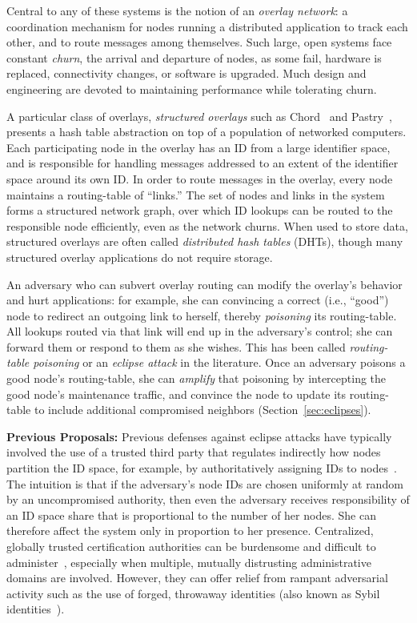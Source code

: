 \documentclass[10pt,twocolumn]{article}
\renewcommand{\paragraph}[1]{\textbf{#1:}}
\begin{document}
Central to any of these systems is the notion of an {\em overlay
network}: a coordination mechanism for nodes running 
a distributed application to track each other, and to route messages
among themselves.  
Such large, open systems face constant \emph{churn},
the arrival and departure of nodes, as some fail,
hardware is replaced, connectivity changes, or software is upgraded.  
Much design and engineering are devoted to maintaining performance while
tolerating churn.

A particular class of overlays, \emph{structured overlays}
such as Chord~\cite{Stoica2003} and Pastry~\cite{Rowstron2001},
presents a hash table abstraction on top of a population of networked
computers.  Each participating node in the overlay has an ID from
a large identifier space, and is responsible for handling
messages addressed to an extent of the identifier space around its own
ID.  In order
to route messages in the overlay,
every node maintains a
routing-table of ``links.''  The set of nodes and links in the system 
forms a structured network graph, over which
ID lookups can be routed to the responsible node efficiently,
even as the network churns.  When used to store data, structured
overlays are often called \emph{distributed hash tables} (DHTs), though many
structured overlay applications do not require storage.

An adversary who can subvert overlay routing can 
modify the overlay's behavior and hurt applications:
for example, she can convincing a
correct (i.e., ``good'') node to redirect an outgoing link to
herself, thereby \emph{poisoning} its routing-table.  
All lookups routed via that link will end up in the adversary's
control; she can forward them or respond to them as she wishes.  This
has been called \emph{routing-table poisoning} or
an \emph{eclipse attack} in the literature.  
Once an adversary poisons a good node's routing-table, she can {\em amplify}
that poisoning by intercepting the good node's maintenance
traffic, and convince the node to update its routing-table to
include additional compromised neighbors (Section~\ref{sec:eclipses}).

\paragraph{Previous Proposals}
Previous defenses against eclipse attacks have typically involved the
use of a trusted third party that regulates indirectly how nodes
partition the ID space, for example, by authoritatively assigning
IDs to nodes~\cite{Castro2002}.  The intuition is that if the
adversary's node IDs are chosen uniformly at random by an uncompromised
authority, then even the adversary receives
responsibility of an ID space share that is proportional to the number
of her nodes. She can therefore affect the system only in proportion to
her presence.
Centralized, globally
trusted certification authorities can be burdensome and difficult to
administer~\cite{Davis1996}, especially when multiple, mutually
distrusting administrative domains are involved.  However, they can offer
relief from rampant adversarial activity such as the use of forged,
throwaway identities (also known as Sybil
identities~\cite{Douceur2002}).
\end{document}
